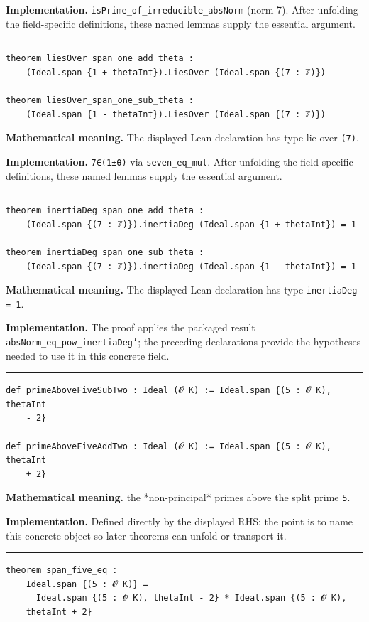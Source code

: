 \documentclass[UTF8,a4paper,11pt,fontset=fandol]{ctexart}
\theoremstyle{definition}
\newcommand{\statementsep}{\par\medskip\hrule\medskip}
\begin{document}
\noindent\textbf{Implementation.} \texttt{isPrime\_\allowbreak{}of\_\allowbreak{}irreducible\_\allowbreak{}absNorm} (norm 7). After unfolding the field-specific definitions, these named lemmas supply the essential argument.\par
\statementsep
\begin{verbatim}
theorem liesOver_span_one_add_theta :
    (Ideal.span {1 + thetaInt}).LiesOver (Ideal.span {(7 : ℤ)})

theorem liesOver_span_one_sub_theta :
    (Ideal.span {1 - thetaInt}).LiesOver (Ideal.span {(7 : ℤ)})
\end{verbatim}
\noindent\textbf{Mathematical meaning.} The displayed Lean declaration has type lie over \texttt{(7)}.\par
\noindent\textbf{Implementation.} \texttt{7∈(1±θ)} via \texttt{seven\_\allowbreak{}eq\_\allowbreak{}mul}. After unfolding the field-specific definitions, these named lemmas supply the essential argument.\par
\statementsep
\begin{verbatim}
theorem inertiaDeg_span_one_add_theta :
    (Ideal.span {(7 : ℤ)}).inertiaDeg (Ideal.span {1 + thetaInt}) = 1

theorem inertiaDeg_span_one_sub_theta :
    (Ideal.span {(7 : ℤ)}).inertiaDeg (Ideal.span {1 - thetaInt}) = 1
\end{verbatim}
\noindent\textbf{Mathematical meaning.} The displayed Lean declaration has type \texttt{inertiaDeg = 1}.\par
\noindent\textbf{Implementation.} The proof applies the packaged result \texttt{absNorm\_\allowbreak{}eq\_\allowbreak{}pow\_\allowbreak{}inertiaDeg'}; the preceding declarations provide the hypotheses needed to use it in this concrete field.\par
\statementsep
\begin{verbatim}
def primeAboveFiveSubTwo : Ideal (𝓞 K) := Ideal.span {(5 : 𝓞 K), thetaInt
    - 2}

def primeAboveFiveAddTwo : Ideal (𝓞 K) := Ideal.span {(5 : 𝓞 K), thetaInt
    + 2}
\end{verbatim}
\noindent\textbf{Mathematical meaning.} the *non-principal* primes above the split prime \texttt{5}.\par
\noindent\textbf{Implementation.} Defined directly by the displayed RHS; the point is to name this concrete object so later theorems can unfold or transport it.\par
\statementsep
\begin{verbatim}
theorem span_five_eq :
    Ideal.span {(5 : 𝓞 K)} =
      Ideal.span {(5 : 𝓞 K), thetaInt - 2} * Ideal.span {(5 : 𝓞 K),
    thetaInt + 2}
\end{verbatim}
\end{document}
